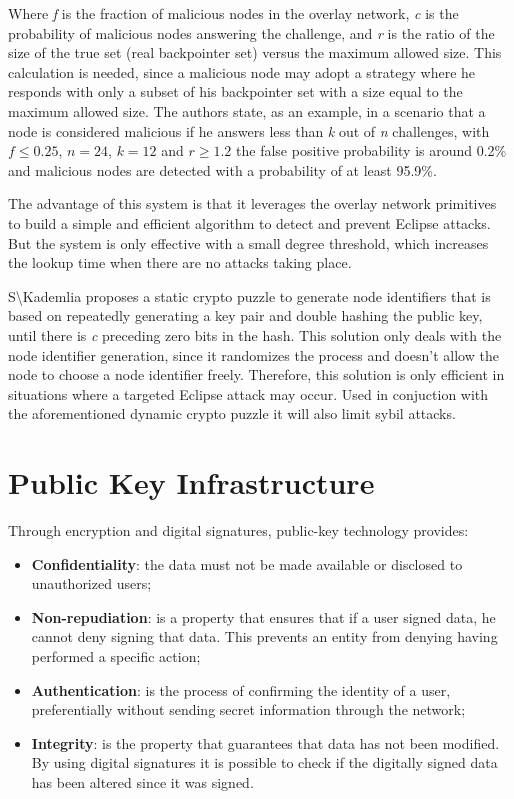 Where \textit{f} is the fraction of malicious nodes in the overlay network, \textit{c} is the probability of malicious nodes answering the challenge, and \textit{r} is the ratio of the size of the true set (real backpointer set) versus the maximum allowed size. This calculation is needed, since a malicious node may adopt a strategy where he responds with only a subset of his backpointer set with a size equal to the maximum allowed size.
The authors state, as an example, in a scenario that a node is considered malicious if he answers less than \textit{k} out of \textit{n} challenges, with \(f \leq 0.25\), \(n=24\), \(k=12\) and \(r \geq 1.2\) the false positive probability is around 0.2\% and malicious nodes are detected with a probability of at least 95.9\%.

The advantage of this system is that it leverages the overlay network primitives to build a simple and efficient algorithm to detect and prevent Eclipse attacks. But the system is only effective with a small degree threshold, which increases the lookup time when there are no attacks taking place.

S\textbackslash{Kademlia} proposes a static crypto puzzle to generate node identifiers that is based on repeatedly generating a key pair and double hashing the public key, until there is \textit{c} preceding zero bits in the hash.
This solution only deals with the node identifier generation, since it randomizes the process and doesn't allow the node to choose a node identifier freely.
Therefore, this solution is only efficient in situations where a targeted Eclipse attack may occur. Used in conjuction with the aforementioned dynamic crypto puzzle it will also limit sybil attacks.

\section{Public Key Infrastructure}
Through encryption and digital signatures\cite{Rivest1978}, public-key technology\cite{Diffie1976} provides:
\begin{itemize}
  \item \textbf{Confidentiality}: the data must not be made available or disclosed to unauthorized users;
  \item \textbf{Non-repudiation}: is a property that ensures that if a user signed data, he cannot deny signing that data. This prevents an entity from denying having performed a specific action;
  \item \textbf{Authentication}: is the process of confirming the identity of a user, preferentially without sending secret information through the network;
  \item \textbf{Integrity}: is the property that guarantees that data has not been modified. By using digital signatures it is possible to check if the digitally signed data has been altered since it was signed.
\end{itemize}


